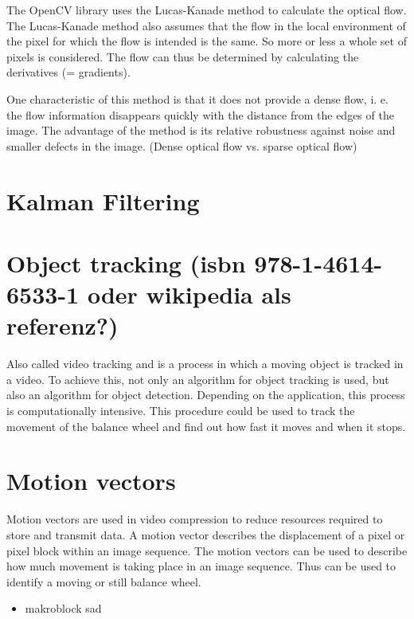 \documentclass[12pt, a4paper]{report}
\begin{document}
    The OpenCV library uses the Lucas-Kanade method to calculate the optical flow. The Lucas-Kanade method also assumes that the flow in the local environment of the pixel for which the flow is intended is the same. So more or less a whole set of pixels is considered. The flow can thus be determined by calculating the derivatives (= gradients). 
    
    One characteristic of this method is that it does not provide a dense flow, i. e. the flow information disappears quickly with the distance from the edges of the image. The advantage of the method is its relative robustness against noise and smaller defects in the image.
    (Dense optical flow vs. sparse optical flow)
  
   \section{Kalman Filtering} 
   \section{Object tracking (isbn 978-1-4614-6533-1 oder wikipedia als referenz?)}
   Also called video tracking and is a process in which a moving object is tracked in a video. To achieve this, not only an algorithm for object tracking is used, but also an algorithm for object detection. Depending on the application, this process is computationally intensive. This procedure could be used to track the movement of the balance wheel and find out how fast it moves and when it stops.
    
 \section{Motion vectors}
 Motion vectors are used in video compression to reduce resources required to store and transmit data. A motion vector describes the displacement of a pixel or pixel block within an image sequence. The motion vectors can be used to describe how much movement is taking place in an image sequence. Thus can be used to identify a moving or still balance wheel.
    \begin{itemize}
        \item makroblock sad
        \end{itemize}
    
   
\end{document}
